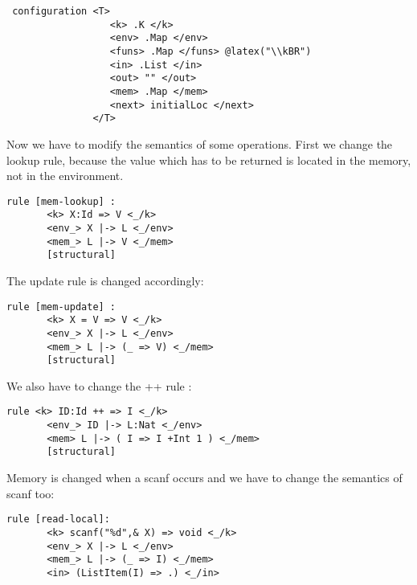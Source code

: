 \documentclass[11pt,a4paper]{article}
\begin{document}
\begin{verbatim}
 configuration <T>                                                           
                  <k> .K </k>                                                   
                  <env> .Map </env>                                             
                  <funs> .Map </funs> @latex("\\kBR")                           
                  <in> .List </in>                                              
                  <out> "" </out>                                               
                  <mem> .Map </mem>                                             
                  <next> initialLoc </next>                                     
               </T> 
\end{verbatim}

Now we have to modify the semantics of some operations. First we change the lookup rule, because the value which has to be returned is located in the memory, not in the environment. 

\begin{verbatim}
rule [mem-lookup] :
       <k> X:Id => V <_/k>                                                      
       <env_> X |-> L <_/env>                                                   
       <mem_> L |-> V <_/mem>                                                   
       [structural]
\end{verbatim}

\noindent The update rule is changed accordingly:
\begin{verbatim}
rule [mem-update] :
       <k> X = V => V <_/k>                                                     
       <env_> X |-> L <_/env>                                                   
       <mem_> L |-> (_ => V) <_/mem>                                            
       [structural]
\end{verbatim}

\noindent We also have to change the ++ rule :
\begin{verbatim}
rule <k> ID:Id ++ => I <_/k>                                                  
       <env_> ID |-> L:Nat <_/env>                                              
       <mem> L |-> ( I => I +Int 1 ) <_/mem>                                    
       [structural]
\end{verbatim}

\noindent Memory is changed when a scanf occurs and we have to change the semantics of scanf too:
\begin{verbatim}
rule [read-local]:                                                            
       <k> scanf("%d",& X) => void <_/k>                                        
       <env_> X |-> L <_/env>                                                   
       <mem_> L |-> (_ => I) <_/mem>                                            
       <in> (ListItem(I) => .) <_/in>
\end{verbatim}
\end{document}
